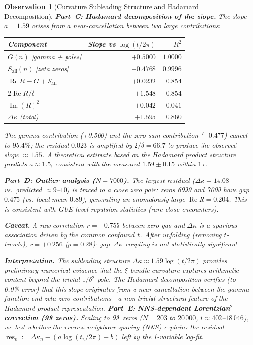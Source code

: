 \documentclass[11pt, a4paper]{article}
\theoremstyle{definition}
\theoremstyle{plain}
\newtheorem{observation}[theorem]{Observation}
\begin{document}
\begin{observation}[Curvature Subleading Structure and Hadamard Decomposition]
\smallskip\noindent
\textbf{Part~C: Hadamard decomposition of the slope.}\;
The slope $a = 1.59$ arises from a near-cancellation between
two large contributions:
\begin{center}
\small
\begin{tabular}{@{} l r r @{}}
\toprule
Component & Slope vs $\log(t/2\pi)$ & $R^2$ \\
\midrule
$G(n)$ [gamma + poles]      & $+0.5000$ & $1.0000$ \\
$S_{\mathrm{all}}(n)$ [zeta zeros] & $-0.4768$ & $0.9996$ \\
$\operatorname{Re} R = G + S_{\mathrm{all}}$  & $+0.0232$ & $0.854$ \\
$2\operatorname{Re} R/\delta$  & $+1.548$ & $0.854$ \\
$\operatorname{Im}(R)^2$      & $+0.042$ & $0.041$ \\
$\Delta\kappa$ (total)        & $+1.595$ & $0.860$ \\
\bottomrule
\end{tabular}
\end{center}
The gamma contribution (+0.500) and the zero-sum contribution
($-0.477$) cancel to $95.4\%$; the residual $0.023$ is amplified
by $2/\delta = 66.7$ to produce the observed slope $\approx 1.55$.
A theoretical estimate based on the Hadamard product structure
predicts $a \approx 1.5$, consistent with the measured $1.59 \pm 0.15$
within $1\sigma$.

\smallskip\noindent
\textbf{Part~D: Outlier analysis ($N{=}7000$).}\;
The largest residual ($\Delta\kappa = 14.08$ vs.\ predicted
${\approx}9$--$10$) is traced to a close zero pair:
zeros 6999 and 7000 have gap $0.475$ (vs.\ local mean $0.89$),
generating an anomalously large $\operatorname{Re} R = 0.204$.
This is consistent with GUE level-repulsion statistics
(rare close encounters).

\smallskip\noindent
\textbf{Caveat.}\;
A raw correlation $r = -0.755$ between zero gap and $\Delta\kappa$
is a spurious association driven by the common confound~$t$.
After unfolding (removing $t$-trends), $r = +0.256$ ($p = 0.28$):
gap--$\Delta\kappa$ coupling is \emph{not} statistically significant.

\smallskip\noindent
\textbf{Interpretation.}\;
The subleading structure $\Delta\kappa \approx 1.59\log(t/2\pi)$
provides preliminary numerical evidence that the $\xi$-bundle
curvature captures arithmetic content beyond the trivial $1/\delta^2$
pole.  The Hadamard decomposition verifies (to 0.0\% error) that this
slope originates from a near-cancellation between the gamma function
and zeta-zero contributions---a non-trivial structural feature of the
Hadamard product representation.
\smallskip\noindent
\textbf{Part~E: NNS-dependent Lorentzian$^2$ correction (99 zeros).}\;
Scaling to 99~zeros ($N = 203$ to $20\,000$, $t \approx 402$--$18\,046$),
we test whether the nearest-neighbour spacing (NNS) explains the residual
$\operatorname{res}_n := \Delta\kappa_n - (a\log(t_n/2\pi) + b)$ left by
the 1-variable log-fit.


\end{observation}
\end{document}
